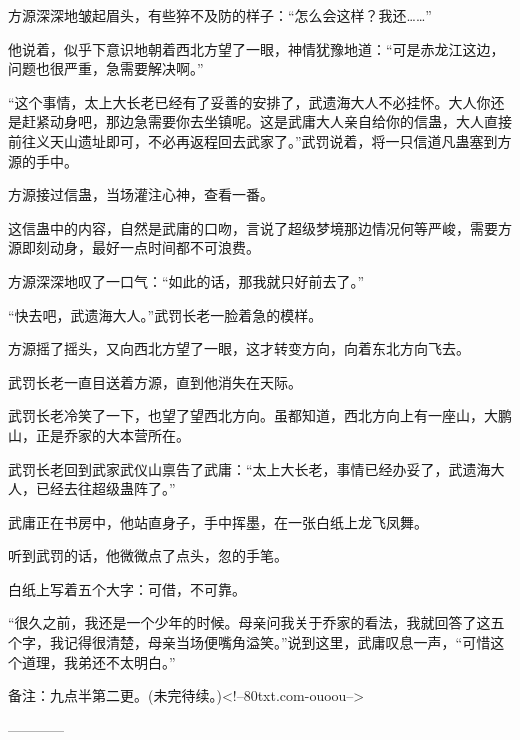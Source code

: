 \begin{this_body}
方源深深地皱起眉头，有些猝不及防的样子：“怎么会这样？我还……”

他说着，似乎下意识地朝着西北方望了一眼，神情犹豫地道：“可是赤龙江这边，问题也很严重，急需要解决啊。”

“这个事情，太上大长老已经有了妥善的安排了，武遗海大人不必挂怀。大人你还是赶紧动身吧，那边急需要你去坐镇呢。这是武庸大人亲自给你的信蛊，大人直接前往义天山遗址即可，不必再返程回去武家了。”武罚说着，将一只信道凡蛊塞到方源的手中。

方源接过信蛊，当场灌注心神，查看一番。

这信蛊中的内容，自然是武庸的口吻，言说了超级梦境那边情况何等严峻，需要方源即刻动身，最好一点时间都不可浪费。

方源深深地叹了一口气：“如此的话，那我就只好前去了。”

“快去吧，武遗海大人。”武罚长老一脸着急的模样。

方源摇了摇头，又向西北方望了一眼，这才转变方向，向着东北方向飞去。

武罚长老一直目送着方源，直到他消失在天际。

武罚长老冷笑了一下，也望了望西北方向。虽都知道，西北方向上有一座山，大鹏山，正是乔家的大本营所在。

武罚长老回到武家武仪山禀告了武庸：“太上大长老，事情已经办妥了，武遗海大人，已经去往超级蛊阵了。”

武庸正在书房中，他站直身子，手中挥墨，在一张白纸上龙飞凤舞。

听到武罚的话，他微微点了点头，忽的手笔。

白纸上写着五个大字：可借，不可靠。

“很久之前，我还是一个少年的时候。母亲问我关于乔家的看法，我就回答了这五个字，我记得很清楚，母亲当场便嘴角溢笑。”说到这里，武庸叹息一声，“可惜这个道理，我弟还不太明白。”

备注：九点半第二更。(未完待续。)<!--80txt.com-ouoou-->

------------

\end{this_body}

